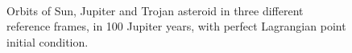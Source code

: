 \documentclass[12pt,a4paper]{article}
\begin{document}
\begin{figure}[H]
 \\
\caption{Orbits of Sun, Jupiter and Trojan asteroid in three different reference frames, in 100 Jupiter years, with perfect Lagrangian point initial condition.}  
\label{fig:figure123_100v_100orbits}
\end{figure}
\end{document}
